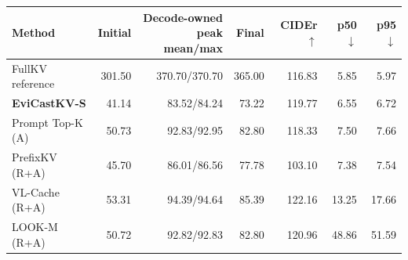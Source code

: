 \begin{tabular}{lrrrrrr}
\toprule
Method & Initial & \shortstack{Decode-owned peak\\mean/max} & Final & CIDEr $\uparrow$ & p50 $\downarrow$ & p95 $\downarrow$\\
\midrule
FullKV reference & 301.50 & 370.70/370.70 & 365.00 & 116.83 & 5.85 & 5.97\\
\textbf{EviCastKV-S} & 41.14 & 83.52/84.24 & 73.22 & 119.77 & 6.55 & 6.72\\
Prompt Top-K (A) & 50.73 & 92.83/92.95 & 82.80 & 118.33 & 7.50 & 7.66\\
PrefixKV (R+A) & 45.70 & 86.01/86.56 & 77.78 & 103.10 & 7.38 & 7.54\\
VL-Cache (R+A) & 53.31 & 94.39/94.64 & 85.39 & 122.16 & 13.25 & 17.66\\
LOOK-M (R+A) & 50.72 & 92.82/92.83 & 82.80 & 120.96 & 48.86 & 51.59\\
\bottomrule
\end{tabular}
